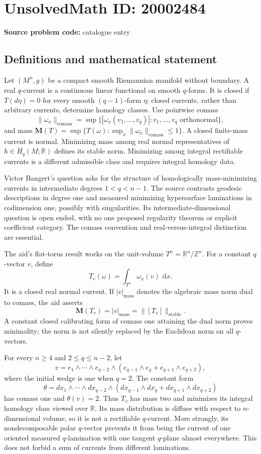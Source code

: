 \documentclass[11pt]{article}
\newcommand{\Z}{\mathbb{Z}}
\newcommand{\R}{\mathbb{R}}
\newcommand{\dd}{\,\mathrm{d}}
\begin{document}
\section*{UnsolvedMath ID: 20002484}
\textbf{Source problem code:} catalogue entry
\subsection{Definitions and mathematical statement}
Let \((M^n,g)\) be a compact smooth Riemannian manifold without boundary. A real \(q\)-current is a continuous linear functional on smooth \(q\)-forms. It is closed if \(T(d\eta)=0\) for every smooth \((q-1)\)-form \(\eta\); closed currents, rather than arbitrary currents, determine homology classes. Use pointwise comass
\[
 \|\omega_x\|_{\mathrm{comass}}=
 \sup\{|\omega_x(v_1,\ldots,v_q)|:v_1,\ldots,v_q\text{ orthonormal}\},
\]
and mass \(\mathbf M(T)=\sup\{T(\omega):\sup_x\|\omega_x\|_{\mathrm{comass}}\le1\}\). A closed finite-mass current is normal. Minimizing mass among real normal representatives of \(h\in H_q(M;\R)\) defines its stable norm. Minimizing among integral rectifiable currents is a different admissible class and requires integral homology data.

Victor Bangert's question asks for the structure of homologically mass-minimizing currents in intermediate degrees \(1<q<n-1\). The source contrasts geodesic descriptions in degree one and measured minimizing hypersurface laminations in codimension one, possibly with singularities. Its intermediate-dimensional question is open ended, with no one proposed regularity theorem or explicit coefficient category. The comass convention and real-versus-integral distinction are essential.

The aid's flat-torus result works on the unit-volume \(T^n=\R^n/\Z^n\). For a constant \(q\)-vector \(v\), define
\[
 T_v(\omega)=\int_{T^n}\omega_x(v)\,\dd x.
\]
It is a closed real normal current. If \(|v|_{\mathrm{mass}}\) denotes the algebraic mass norm dual to comass, the aid asserts
\[
 \mathbf M(T_v)=|v|_{\mathrm{mass}}=\|[T_v]\|_{\mathrm{stable}}.
\]
A constant closed calibrating form of comass one attaining the dual norm proves minimality; the norm is not silently replaced by the Euclidean norm on all \(q\)-vectors.

For every \(n\ge4\) and \(2\le q\le n-2\), let
\[
 v=e_1\wedge\cdots\wedge e_{q-2}\wedge
 (e_{q-1}\wedge e_q+e_{q+1}\wedge e_{q+2}),
\]
where the initial wedge is one when \(q=2\). The constant form
\[
 \theta=dx_1\wedge\cdots\wedge dx_{q-2}\wedge
 (dx_{q-1}\wedge dx_q+dx_{q+1}\wedge dx_{q+2})
\]
has comass one and \(\theta(v)=2\). Thus \(T_v\) has mass two and minimizes its integral homology class viewed over \(\R\). Its mass distribution is diffuse with respect to \(n\)-dimensional volume, so it is not a rectifiable \(q\)-current. More strongly, its nondecomposable polar \(q\)-vector prevents it from being the current of one oriented measured \(q\)-lamination with one tangent \(q\)-plane almost everywhere. This does not forbid a sum of currents from different laminations.
\end{document}
